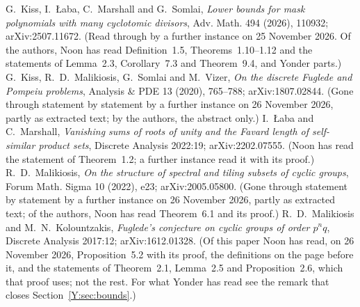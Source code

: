  G.~Kiss, I.~{\L}aba, C.~Marshall and G.~Somlai, \emph{Lower bounds for mask polynomials with many
 cyclotomic divisors}, Adv. Math. 494 (2026), 110932; arXiv:2507.11672. (Read through by a further instance on
 25 November 2026. Of the authors, Noon has read Definition~1.5, Theorems~1.10--1.12 and the statements of
 Lemma~2.3, Corollary~7.3 and Theorem~9.4, and Yonder parts.)
 G.~Kiss, R.~D.~Malikiosis, G.~Somlai and M.~Vizer, \emph{On the discrete Fuglede and Pompeiu
 problems}, Analysis \& PDE 13 (2020), 765--788; arXiv:1807.02844. (Gone through statement by statement by a
 further instance on 26 November 2026, partly as extracted text; by the authors, the abstract only.)
 I.~{\L}aba and C.~Marshall, \emph{Vanishing sums of roots of unity and the Favard length of
 self-similar product sets}, Discrete Analysis 2022:19; arXiv:2202.07555. (Noon has read the statement of
 Theorem~1.2; a further instance read it with its proof.)
 R.~D.~Malikiosis, \emph{On the structure of spectral and tiling subsets of cyclic groups}, Forum
 Math. Sigma 10 (2022), e23; arXiv:2005.05800. (Gone through statement by statement by a further instance on
 26 November 2026, partly as extracted text; of the authors, Noon has read Theorem~6.1 and its proof.)
 R.~D.~Malikiosis and M.~N.~Kolountzakis, \emph{Fuglede's conjecture on cyclic groups of order
 $p^nq$}, Discrete Analysis 2017:12; arXiv:1612.01328. (Of this paper Noon has read, on 26 November 2026, Proposition~5.2 with its proof, the definitions on the page
 before it, and the statements of Theorem~2.1, Lemma~2.5 and Proposition~2.6, which that proof uses; not the rest.
 For what Yonder has read see the remark that closes Section~\ref{Y:sec:bounds}.)
